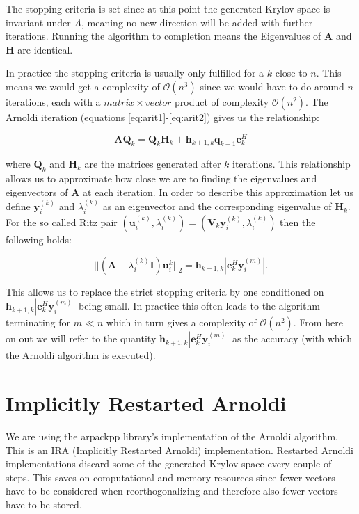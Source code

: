 \documentclass[a4paper, oneside]{discothesis}
\begin{document}
The stopping criteria is set since at this point the generated Krylov space is invariant under $A$, meaning no new direction will be added with further iterations.
Running the algorithm to completion means the Eigenvalues of $\mathbf{A}$ and $\mathbf{H}$ are identical. 

In practice the stopping criteria is usually only fulfilled for a $k$ close to $n$.
This means we would get a complexity of $\mathcal{O}(n^3)$ since we would have to do around $n$ iterations, each with a $matrix\times vector$ product of complexity $\mathcal{O}(n^2)$.
The Arnoldi iteration (equations \ref{eq:arit1}-\ref{eq:arit2}) gives us the relationship:

\begin{equation}
	\mathbf{AQ}_k = \mathbf{Q}_k\mathbf{H}_k + \mathbf{h}_{k+1,k}\mathbf{q}_{k+1}\mathbf{e}_k^H
\end{equation}

where $\mathbf{Q}_k$ and $\mathbf{H}_k$ are the matrices generated after $k$ iterations.
This relationship allows us to approximate how close we are to finding the eigenvalues and eigenvectors of $\mathbf{A}$ at each iteration.
In order to describe this approximation let us define $\mathbf{y}_i^{(k)}$ and $\lambda_i^{(k)}$ as an eigenvector and the corresponding eigenvalue of $\mathbf{H}_k$. 
For the so called Ritz pair $(\mathbf{u}_i^{(k)},\lambda_i^{(k)})=(\mathbf{V}_k\mathbf{y}_i^{(k)},\lambda_i^{(k)})$ then the following holds:

\begin{equation}
	||(\mathbf{A}-\lambda_i^{(k)}\mathbf{I})\mathbf{u}_i^{k}||_2 = \mathbf{h}_{k+1,k} |\mathbf{e}_k^H\mathbf{y}_i^{(m)}|.	
\end{equation}

This allows us to replace the strict stopping criteria by one conditioned on $\mathbf{h}_{k+1,k} |\mathbf{e}_k^H\mathbf{y}_i^{(m)}|$ being small.
In practice this often leads to the algorithm terminating for $m \ll n$ which in turn gives a complexity of $\mathcal{O}(n^2)$. \cite{doi:10.1137/1.9781611970739.ch6} 
From here on out we will refer to the quantity $\mathbf{h}_{k+1,k} |\mathbf{e}_k^H\mathbf{y}_i^{(m)}|$ as the accuracy (with which the Arnoldi algorithm is executed).


\section{Implicitly Restarted Arnoldi}
We are using the arpackpp\cite{arpackpp} library's implementation of the Arnoldi algorithm.
This is an IRA (Implicitly Restarted Arnoldi) implementation.
Restarted Arnoldi implementations discard some of the generated Krylov space every couple of steps.
This saves on computational and memory resources since fewer vectors have to be considered when reorthogonalizing and therefore also fewer vectors have to be stored.
\end{document}
